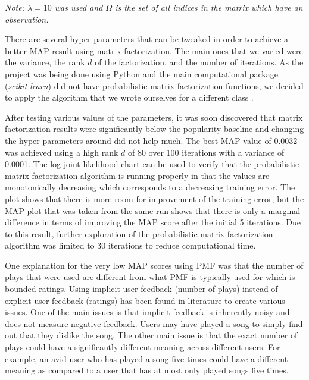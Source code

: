 \documentclass[12pt,preprint]{aastex}
\begin{document}
\emph{Note: $\lambda = 10$ was used and $\Omega$ is the set of all indices in the matrix which have an observation.}

There are several hyper-parameters that can be tweaked in order to achieve a better MAP result using matrix factorization. The main ones that we varied were the variance, the rank $d$ of the factorization, and the number of iterations. As the project was being done using Python and the main computational package (\emph{scikit-learn}) did not have probabilistic matrix factorization functions, we decided to apply the algorithm that we wrote ourselves for a different class \citep{koren2009matrix}. 
 
After testing various values of the parameters, it was soon discovered that matrix factorization results were significantly below the popularity baseline and changing the hyper-parameters around did not help much. The best MAP value of 0.0032 was achieved using a high rank $d$ of 80 over 100 iterations with a variance of 0.0001. The log joint likelihood chart can be used to verify that the probabilistic matrix factorization algorithm is running properly in that the values are monotonically decreasing which corresponds to a decreasing training error. The plot shows that there is more room for improvement of the training error, but the MAP plot that was taken from the same run shows that there is only a marginal difference in terms of improving the MAP score after the initial 5 iterations. Due to this result, further exploration of the probabilistic matrix factorization algorithm was limited to 30 iterations to reduce computational time. 
 
One explanation for the very low MAP scores using PMF was that the number of plays that were used are different from what PMF is typically used for which is bounded ratings. Using implicit user feedback (number of plays) instead of explicit user feedback (ratings) has been found in literature to create various issues. One of the main issues is that implicit feedback is inherently noisy and does not measure negative feedback. Users may have played a song to simply find out that they dislike the song. The other main issue is that the exact number of plays could have a significantly different meaning across different users. For example, an avid user who has played a song five times could have a different meaning as compared to a user that has at most only played songs five times.
 
\end{document}
